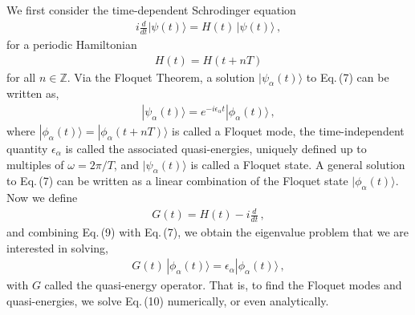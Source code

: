 \documentclass[reprint, amsmath, amssymb, aps]{revtex4-2}
\begin{document}
We first consider the time-dependent Schrodinger equation
\begin{align}
i \frac{d}{dt}|\psi(t)\rangle = H(t) \, |\psi(t)\rangle\,,
\end{align} 
for a periodic Hamiltonian 
\begin{align}
H(t) = H(t+nT)
\end{align}
for all $n \in \mathbb{Z}$. Via the Floquet Theorem, a solution $|\psi_\alpha(t)\rangle$ to Eq.\,(7) can be written as,
\begin{align}
|\psi_\alpha(t)\rangle =  e^{-i \epsilon_\alpha t }|\phi_\alpha (t)\rangle\,,
\end{align}
where $|\phi_\alpha(t) \rangle = |\phi_\alpha(t+nT)\rangle$ is called a Floquet mode, the time-independent quantity $\epsilon_\alpha$ is called the associated quasi-energies, uniquely defined up to multiples of $\omega = 2\pi/T$, and $|\psi_\alpha(t)\rangle$ is called a Floquet state. A general solution to Eq.\,(7) can be written as a linear combination of the Floquet state $|\phi_\alpha(t)\rangle$. Now we define
\begin{align}
G(t) = H(t) - i \frac{d}{dt}\,,
\end{align}
and combining Eq.\,(9) with Eq.\,(7), we obtain the eigenvalue problem that we are interested in solving,
\begin{align}
G(t) \, |\phi_\alpha (t) \rangle = \epsilon_\alpha |\phi_\alpha(t)\rangle\,,
\end{align}
with $G$ called the quasi-energy operator. That is, to find the Floquet modes and quasi-energies, we solve Eq.\,(10) numerically, or even analytically. \\
\end{document}

